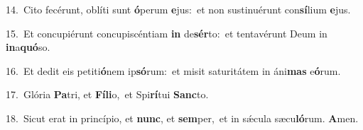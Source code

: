 {\numbfont\textcolor{\numbcolor}{14.}}~Cito fecérunt, oblíti sunt \textbf{ó}\-perum \textbf{e}\-jus:~\star et non sustinuérunt con\-\textbf{sí}\-lium \textbf{e}\-jus.\par
{\numbfont\textcolor{\numbcolor}{15.}}~Et concupiérunt concupiscéntiam \textbf{in} de\-\textbf{sér}\-to:~\star et tentavérunt Deum in \textbf{in}\-a\-\textbf{quó}\-so.\par
{\numbfont\textcolor{\numbcolor}{16.}}~Et dedit eis petiti\-\textbf{ó}\-nem ip\-\textbf{só}\-rum:~\star et misit saturitátem in áni\textbf{mas} e\-\textbf{ó}\-rum.\par
{\numbfont\textcolor{\numbcolor}{17.}}~Glória \textbf{Pa}\-tri, et \textbf{Fí}\-\textbf{li}o,~\star et Spi\-\textbf{rí}\-tui \textbf{Sanc}\-to.\par
{\numbfont\textcolor{\numbcolor}{18.}}~Sicut erat in princípio, et \textbf{nunc}\-, et \textbf{sem}\-per,~\star et in sǽcula sæcu\-\textbf{ló}\-rum. \textbf{A}\-men.\par
